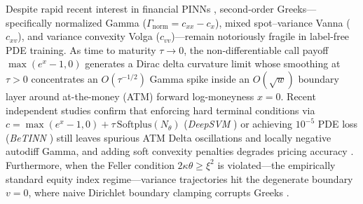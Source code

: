 \documentclass[preprint,12pt]{elsarticle}
\begin{document}
Despite rapid recent interest in financial PINNs \cite{hainaut2024option,hsu2024accurate,chakhoyan2025deepsvm,tan2026icpinns,sakuma2026dml,lararangel2026betinn,georgoulis2026deep,feng2026fideeponet}, second-order Greeks---specifically normalized Gamma ($\Gamma_{\mathrm{norm}} = c_{xx} - c_x$), mixed spot--variance Vanna ($c_{xv}$), and variance convexity Volga ($c_{vv}$)---remain notoriously fragile in label-free PDE training. As time to maturity $\tau \to 0$, the non-differentiable call payoff $\max(e^x - 1, 0)$ generates a Dirac delta curvature limit whose smoothing at $\tau > 0$ concentrates an $O(\tau^{-1/2})$ Gamma spike inside an $O(\sqrt{w})$ boundary layer around at-the-money (ATM) forward log-moneyness $x = 0$. Recent independent studies confirm that enforcing hard terminal conditions via $c = \max(e^x - 1, 0) + \tau\,\mathrm{Softplus}(N_\theta)$ (\emph{DeepSVM} \cite{chakhoyan2025deepsvm}) or achieving $10^{-5}$ PDE loss (\emph{BeTINN} \cite{lararangel2026betinn}) still leaves spurious ATM Delta oscillations and locally negative autodiff Gamma, and adding soft convexity penalties degrades pricing accuracy \cite{chakhoyan2025deepsvm}. Furthermore, when the Feller condition $2\kappa\theta \ge \xi^2$ is violated---the empirically standard equity index regime---variance trajectories hit the degenerate boundary $v = 0$, where naive Dirichlet boundary clamping corrupts Greeks \cite{ekstrom2010black}.
\end{document}
